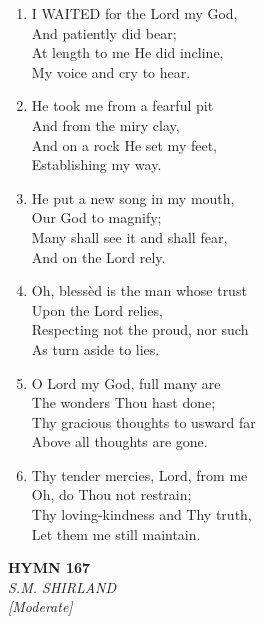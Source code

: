 \begin{enumerate}
    \item I WAITED for the Lord my God, \\
        And patiently did bear; \\
        At length to me He did incline, \\
        My voice and cry to hear.

    \item He took me from a fearful pit \\
        And from the miry clay, \\
        And on a rock He set my feet, \\
        Establishing my way.

    \item He put a new song in my mouth, \\
        Our God to magnify; \\
        Many shall see it and shall fear, \\
        And on the Lord rely.

    \item Oh, bless\`ed is the man whose trust \\
        Upon the Lord relies, \\
        Respecting not the proud, nor such \\
        As turn aside to lies.

    \item O Lord my God, full many are \\
        The wonders Thou hast done; \\
        Thy gracious thoughts to usward far \\
        Above all thoughts are gone.

    \item Thy tender mercies, Lord, from me \\
        Oh, do Thou not restrain; \\
        Thy loving-kindness and Thy truth, \\
        Let them me still maintain.

\end{enumerate}

\newpage
\begin{center}
    {\Large \textbf{HYMN 167}}
    \\
    \textit{S.M. SHIRLAND}
    \\
    \textit{\small [Moderate]}
\end{center}
\vspace{1em}

